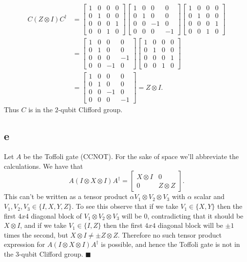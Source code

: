 \documentclass[letterpaper,12pt,oneside,onecolumn]{article}
\begin{document}
 \begin{align*}
 C(Z\otimes I)C^\dagger &=  \begin{bmatrix} 1 & 0 & 0 & 0 \\ 0 & 1 & 0 & 0 \\ 0 & 0 & 0 &1 \\ 0& 0& 1 & 0 \end{bmatrix} \begin{bmatrix}1 &0 &0 &0 \\0 & 1 & 0 &0 \\ 0 &0 &-1 & 0\\ 0 &0 &0 & -1 \end{bmatrix}  \begin{bmatrix} 1 & 0 & 0 & 0 \\ 0 & 1 & 0 & 0 \\ 0 & 0 & 0 &1 \\ 0& 0& 1 & 0 \end{bmatrix}\\
 &= \begin{bmatrix} 1& 0 & 0 &0 \\0 &1 & 0 &0 \\ 0 & 0 &0 &-1 \\ 0 & 0 & -1 &0\end{bmatrix} \begin{bmatrix} 1 & 0 & 0 & 0 \\ 0 & 1 & 0 & 0 \\ 0 & 0 & 0 &1 \\ 0& 0& 1 & 0 \end{bmatrix}\\
 &= \begin{bmatrix} 1 & 0 &0 &0 \\ 0 &1 & 0 &0\\ 0 & 0 &-1 & 0 \\ 0 & 0 & 0 & -1 \end{bmatrix} = Z\otimes I.
 \end{align*}
 Thus $C$ is in the $2$-qubit Clifford group.
 \subsection{e}
 Let $A$ be the Toffoli gate (CCNOT). For the sake of space we'll abbreviate the calculations. We have that
 $$A(I\otimes X\otimes I) A^\dagger = \begin{bmatrix} X\otimes I & 0 \\ 0 & Z\otimes Z\end{bmatrix}.$$
 This can't be written as a tensor product $\alpha V_1\otimes V_2 \otimes V_3$ with $\alpha$ scalar and $V_1,V_2, V_3 \in \{I,X,Y,Z\}$. To see this observe that if we take $V_1 \in  \{X, Y\}$ then the first $4x4$ diagonal block of $V_1\otimes V_2 \otimes V_3$ will be $0$, contradicting that it should be $X \otimes I$, and if we take $V_1 \in \{I,Z\}$ then the first $4x4$ diagonal block will be $\pm1$ times the second, but $X\otimes I \neq \pm Z\otimes Z$. Therefore no such tensor product expression for $A(I\otimes X \otimes I)A^\dagger$ is possible, and hence the Toffoli gate is not in the $3$-qubit Clifford group. $\blacksquare$
 \newpage\section{}
\end{document}

